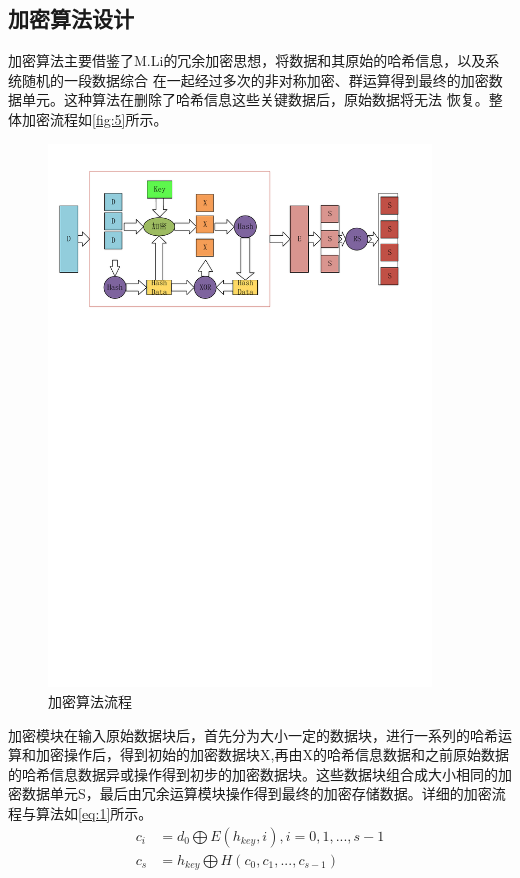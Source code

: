 \subsection{加密算法设计}
加密算法主要借鉴了M.Li\cite{Li2014Convergent}的冗余加密思想，将数据和其原始的哈希信息，以及系统随机的一段数据综合
在一起经过多次的非对称加密、群运算得到最终的加密数据单元。这种算法在删除了哈希信息这些关键数据后，原始数据将无法
恢复。整体加密流程如\autoref{fig:5}所示。
\begin{figure}[H]
	\centering
	\includegraphics[width=4in]{Pics/encrypt.pdf}
	\caption{加密算法流程}\label{fig:5}
\end{figure}
加密模块在输入原始数据块后，首先分为大小一定的数据块，进行一系列的哈希运算和加密操作后，得到初始的加密数据块X,再由X的哈希信息数据和之前原始数据的哈希信息数据异或操作得到初步的加密数据块。这些数据块组合成大小相同的加密数据单元S，最后由冗余运算模块操作得到最终的加密存储数据。详细的加密流程与算法如\autoref{eq:1}所示。
\begin{equation}
    \label{eq:1}
    \begin{aligned}
        c_{i} &=d_{0} \bigoplus E(h_{key},i),i=0,1,...,s-1 \\ %
        c_{s} &=h_{key} \bigoplus H(c_0,c_1,...,c_{s-1})     
    \end{aligned}
\end{equation}
